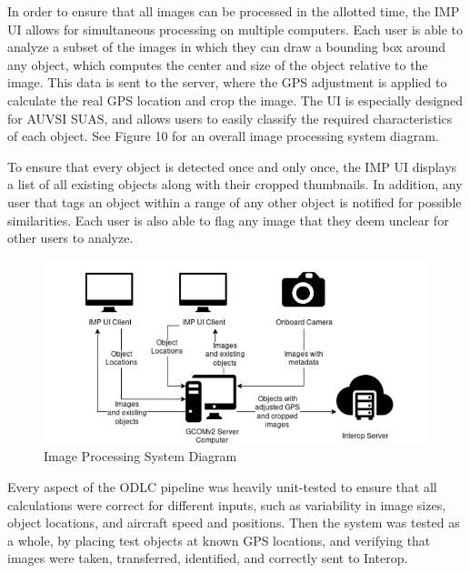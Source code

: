 In order to ensure that all images can be processed in the allotted time, the IMP UI allows for simultaneous processing on multiple computers. Each user is able to analyze a subset of the images in which they can draw a bounding box around any object, which computes the center and size of the object relative to the image. This data is sent to the server, where the GPS adjustment is applied to calculate the real GPS location and crop the image. The UI is especially designed for AUVSI SUAS, and allows users to easily classify the required characteristics of each object. See Figure 10 for an overall image processing system diagram.

To ensure that every object is detected once and only once, the IMP UI displays a list of all existing objects along with their cropped thumbnails. In addition, any user that tags an object within a range of any other object is notified for possible similarities. Each user is also able to flag any image that they deem unclear for other users to analyze.

\begin{figure}[H]\centering
\includegraphics[width=\linewidth]{figures/ODLC3}
\caption{Image Processing System Diagram }
\label{fig:ODLC3}
\end{figure}

Every aspect of the ODLC pipeline was heavily unit-tested to ensure that all calculations were correct for different inputs, such as variability in image sizes, object locations, and aircraft speed and positions. Then the system was tested as a whole, by placing test objects at known GPS locations, and verifying that images were taken, transferred, identified, and correctly sent to Interop.



\endinput